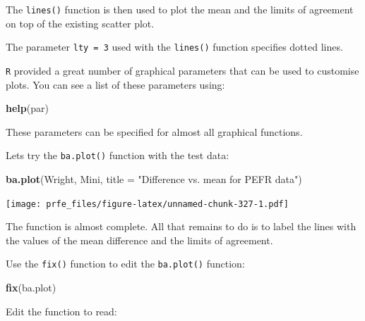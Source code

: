 \documentclass[12pt,a4paper]{book}
\newenvironment{Shaded}{\begin{snugshade}}{\end{snugshade}}
\newcommand{\DataTypeTok}[1]{\textcolor[rgb]{0.13,0.29,0.53}{#1}}
\newcommand{\KeywordTok}[1]{\textcolor[rgb]{0.13,0.29,0.53}{\textbf{#1}}}
\newcommand{\NormalTok}[1]{#1}
\newcommand{\StringTok}[1]{\textcolor[rgb]{0.31,0.60,0.02}{#1}}
\theoremstyle{definition}
\theoremstyle{definition}
\theoremstyle{definition}
\theoremstyle{remark}
\begin{document}
The \texttt{lines()} function is then used to plot the mean and the
limits of agreement on top of the existing scatter plot.

The parameter \texttt{lty\ =\ 3} used with the \texttt{lines()} function
specifies dotted lines.

\texttt{R} provided a great number of graphical parameters that can be
used to customise plots. You can see a list of these parameters using:

\begin{Shaded}
\begin{Highlighting}[]
\KeywordTok{help}\NormalTok{(par)}
\end{Highlighting}
\end{Shaded}

These parameters can be specified for almost all graphical functions.

Lets try the \texttt{ba.plot()} function with the test data:

\begin{Shaded}
\begin{Highlighting}[]
\KeywordTok{ba.plot}\NormalTok{(Wright, Mini, }\DataTypeTok{title =}  \StringTok{"Difference vs. mean for PEFR data"}\NormalTok{)}
\end{Highlighting}
\end{Shaded}

\texttt{[image: prfe\_files/figure-latex/unnamed-chunk-327-1.pdf]}

The function is almost complete. All that remains to do is to label the
lines with the values of the mean difference and the limits of
agreement.

Use the \texttt{fix()} function to edit the \texttt{ba.plot()} function:

\begin{Shaded}
\begin{Highlighting}[]
\KeywordTok{fix}\NormalTok{(ba.plot)}
\end{Highlighting}
\end{Shaded}

Edit the function to read:
\end{document}
